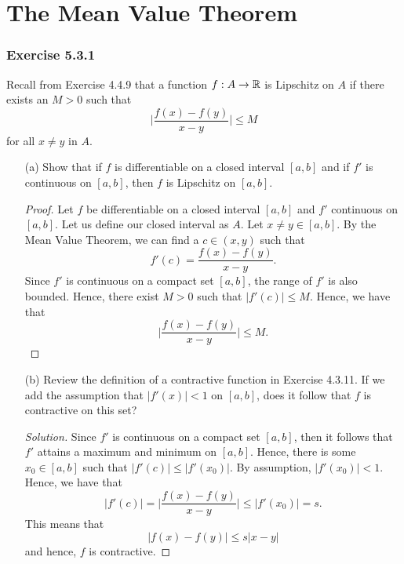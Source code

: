 \section{The Mean Value Theorem}

\subsubsection{Exercise 5.3.1} Recall from Exercise 4.4.9 that a function \( f: A \to \mathbb{R}  \) is Lipschitz on \( A  \) if there exists an \( M > 0  \) such that 
\[  \Big| \frac{ f(x) - f(y)  }{ x - y  }   \Big| \leq M     \] for all \( x \neq y  \) in \( A  \).

\begin{enumerate}
    \item[(a)] Show that if \( f  \) is differentiable on a closed interval \( [a,b]  \) and if \( f'  \) is continuous on \( [a,b]  \), then \( f  \) is Lipschitz on \( [a,b]  \).
        \begin{proof}
            Let \( f  \) be differentiable on a closed interval \( [a,b]  \) and \( f'  \) continuous on \( [a,b]  \). Let us define our closed interval as \( A  \). Let \( x \neq y \in [a,b]  \). By the Mean Value Theorem, we can find a \( c \in (x,y)  \) such that 
            \[  f'(c) = \frac{ f(x) - f(y)  }{ x - y  }. \]
            Since \( f' \) is continuous on a compact set \( [a,b]  \), the range of \( f'  \) is also bounded. Hence, there exist \( M > 0  \) such that \( | f'(c)  | \leq M  \). Hence, we have that 
            \[  \Big| \frac{ f(x) - f(y)  }{ x -y  }  \Big| \leq M. \]
        \end{proof}
    \item[(b)] Review the definition of a contractive function in Exercise 4.3.11. If we add the assumption that \( | f'(x)  | < 1  \) on \( [a,b]  \), does it follow that \( f  \) is contractive on this set? 
    \begin{proof}[Solution]
        Since \( f'  \) is continuous on a compact set \( [a,b]  \), then it follows that \( f'  \) attains a maximum and minimum on \( [a,b]  \). Hence, there is some \( x_0 \in [a,b]  \) such that \( | f'(c)  | \leq | f'(x_0) |  \). By assumption, \( | f'(x_0) | < 1  \). Hence, we have that 
        \[ | f'(c)  | = \Big| \frac{ f(x) - f(y)  }{ x -y  }  \Big| \leq | f'(x_0)  | = s.  \]
        This means that 
        \[  | f(x) - f(y)  | \leq s | x - y  | \]
        and hence, \( f  \) is contractive.
    \end{proof}
\end{enumerate}

